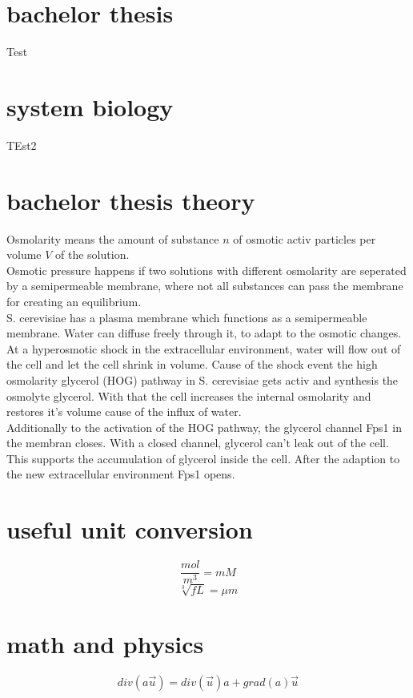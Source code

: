 \documentclass[12pt,a4paper,bibliography=totocnumbered]{scrartcl}
\begin{document}
	
\section{bachelor thesis }
Test

\section{system biology}
TEst2

\section{bachelor thesis theory}
Osmolarity means the amount of substance $n$ of osmotic activ particles per volume $V$ of the solution. \\
Osmotic pressure happens if two solutions with different osmolarity are seperated by a semipermeable membrane, where not all substances can pass the membrane for creating an equilibrium.\\ 
S. cerevisiae has a plasma membrane which functions as a semipermeable membrane. Water can diffuse freely through it, to adapt to the osmotic changes. At a hyperosmotic shock in the extracellular environment, water will flow out of the cell and let the cell shrink in volume. Cause of the shock event the high osmolarity glycerol (HOG) pathway in S. cerevisiae gets activ and synthesis the osmolyte glycerol. With that the cell increases the internal osmolarity and restores it's volume cause of the influx of water. \\
Additionally to the activation of the HOG pathway, the glycerol channel Fps1 in the membran closes. With a closed channel, glycerol can't leak out of the cell. This supports the accumulation of glycerol inside the cell. After the adaption to the new extracellular environment Fps1 opens.
\section{useful unit conversion}
\begin{equation*}
	\frac{mol}{m^3}=mM
\end{equation*}
\begin{equation*}
\sqrt[3]{fL}=\mu m
\end{equation*}

\section{math and physics}
\begin{equation*}
div(a\vec{u}) = div(\vec{u})a + grad(a)\vec{u}
\end{equation*}
\end{document}
